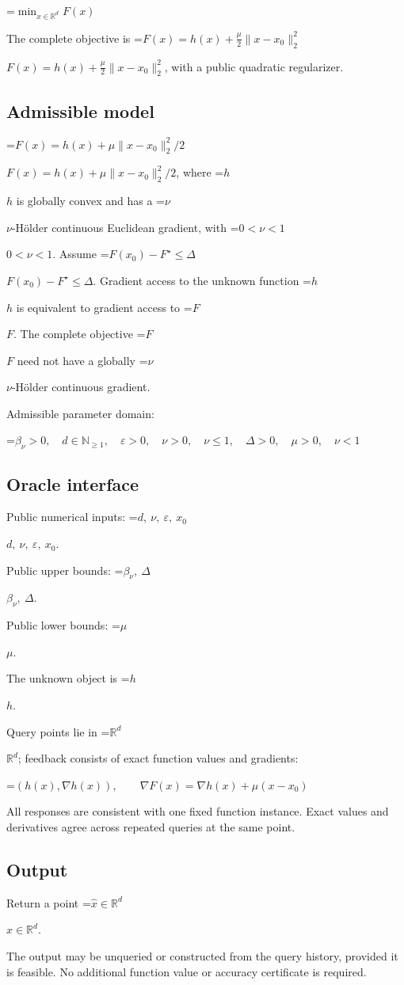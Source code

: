 \documentclass[10pt,a4paper]{article}
\newcommand{\AtlasMath}[1]{\par\begingroup\centering\setbox0=\hbox{$\displaystyle #1$}\ifdim\wd0>1.4\linewidth\typeout{ATLAS WIDE FORMULA: \the\wd0}\fi\ifdim\wd0>\linewidth\resizebox{\linewidth}{!}{\box0}\else\box0\fi\par\endgroup}
\newcommand{\AtlasInlineMath}[1]{\begingroup\setbox0=\hbox{$#1$}\ifdim\wd0>.4\linewidth\endgroup\AtlasMath{#1}\else\endgroup$#1$\fi}
\begin{document}
\AtlasMath{\min_{x\in \mathbb{R}^d}F(x)}


The complete objective is \AtlasInlineMath{F(x)=h(x)+\frac\mu2\|x-x_0\|_2^2}, with a public quadratic regularizer.

\subsection{Admissible model}
\AtlasInlineMath{F(x)=h(x)+\mu\|x-x_0\|_2^2/2}, where \AtlasInlineMath{h} is globally convex and has a \AtlasInlineMath{\nu}-Hölder continuous Euclidean gradient, with \AtlasInlineMath{0<\nu<1}. Assume \AtlasInlineMath{F(x_0)-F^\star\le\Delta}. Gradient access to the unknown function \AtlasInlineMath{h} is equivalent to gradient access to \AtlasInlineMath{F}. The complete objective \AtlasInlineMath{F} need not have a globally \AtlasInlineMath{\nu}-Hölder continuous gradient.

Admissible parameter domain:


\AtlasMath{\beta_\nu>0,\quad d\in\mathbb{N}_{\ge1},\quad \varepsilon>0,\quad \nu>0,\quad \nu\le1,\quad \Delta>0,\quad \mu>0,\quad \nu<1}


\subsection{Oracle interface}
Public numerical inputs: \AtlasInlineMath{d,\ \nu,\ \varepsilon,\ x_0}.

Public upper bounds: \AtlasInlineMath{\beta_\nu,\ \Delta}.

Public lower bounds: \AtlasInlineMath{\mu}.

The unknown object is \AtlasInlineMath{h}.

Query points lie in \AtlasInlineMath{\mathbb{R}^d}; feedback consists of exact function values and gradients:


\AtlasMath{(h(x),\nabla h(x)),\qquad\nabla F(x)=\nabla h(x)+\mu(x-x_0)}


All responses are consistent with one fixed function instance. Exact values and derivatives agree across repeated queries at the same point.

\subsection{Output}
Return a point \AtlasInlineMath{\widehat x\in\mathbb R^d}.

The output may be unqueried or constructed from the query history, provided it is feasible. No additional function value or accuracy certificate is required.
\end{document}

